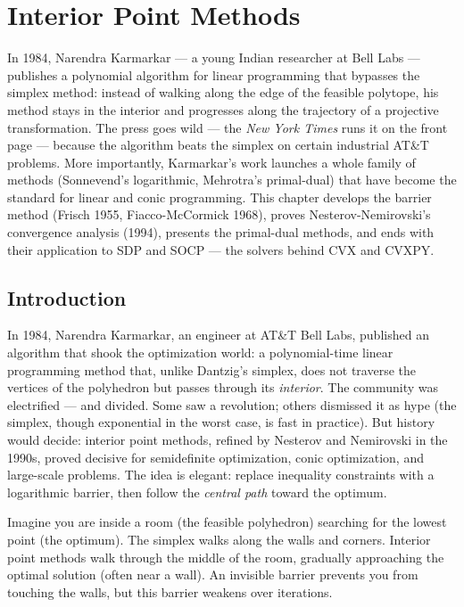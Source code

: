 \chapter{Interior Point Methods}
\label{ch:interior_point}

In 1984, Narendra Karmarkar --- a young Indian researcher at Bell Labs --- publishes a polynomial algorithm for linear programming that bypasses the simplex method: instead of walking along the edge of the feasible polytope, his method stays in the interior and progresses along the trajectory of a projective transformation. The press goes wild --- the \emph{New York Times} runs it on the front page --- because the algorithm beats the simplex on certain industrial AT\&T problems. More importantly, Karmarkar's work launches a whole family of methods (Sonnevend's logarithmic, Mehrotra's primal-dual) that have become the standard for linear and conic programming. This chapter develops the barrier method (Frisch 1955, Fiacco-McCormick 1968), proves Nesterov-Nemirovski's convergence analysis (1994), presents the primal-dual methods, and ends with their application to SDP and SOCP --- the solvers behind CVX and CVXPY.

\section{Introduction}

In 1984, Narendra Karmarkar, an engineer at AT\&T Bell Labs, published an algorithm that shook the optimization world: a polynomial-time linear programming method that, unlike Dantzig's simplex, does not traverse the vertices of the polyhedron but passes through its \emph{interior}. The community was electrified --- and divided. Some saw a revolution; others dismissed it as hype (the simplex, though exponential in the worst case, is fast in practice). But history would decide: interior point methods, refined by Nesterov and Nemirovski in the 1990s, proved decisive for semidefinite optimization, conic optimization, and large-scale problems. The idea is elegant: replace inequality constraints with a logarithmic barrier, then follow the \emph{central path} toward the optimum.

\begin{intuition}
Imagine you are inside a room (the feasible polyhedron) searching for the
lowest point (the optimum). The simplex walks along the walls and corners.
Interior point methods walk through the middle of the room, gradually
approaching the optimal solution (often near a wall). An invisible barrier
prevents you from touching the walls, but this barrier weakens over
iterations.
\end{intuition}

